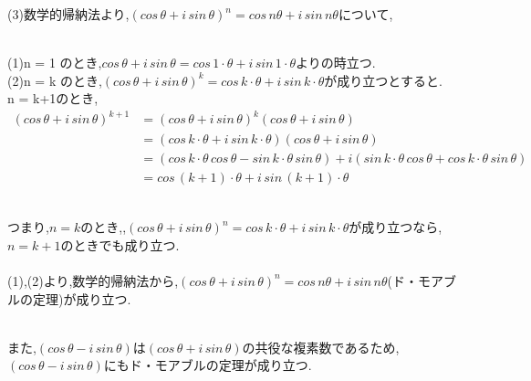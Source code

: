 \documentclass{jsarticle}
\begin{document}
\newpage
\raggedright (3)数学的帰納法より,$(cos\,\theta + i\,sin\,\theta)^n = cos\,n\theta + i\,sin\,n\theta$について,

\leavevmode\\
(1)\qquad n = 1 のとき,$cos\,\theta + i\,sin\,\theta = cos\,1\cdot \theta + i\,sin\,1\cdot \theta$よりの時立つ.\\
(2)\qquad n = k のとき,$(cos\,\theta + i\,sin\,\theta)^k = cos\,k \cdot \theta + i\,sin\,k \cdot \theta$が成り立つとすると.\\
\quad\qquad n = k+1のとき,
\begin{align*}
  (cos\,\theta + i\,sin\,\theta)^{k+1} &= (cos\,\theta + i\,sin\,\theta)^{k}(cos\,\theta + i\,sin\,\theta)\\
                                       &= (cos\,k \cdot \theta + i\,sin\,k \cdot \theta)(cos\,\theta + i\,sin\,\theta)\\
                                       &= (cos\,k \cdot \theta\, cos\, \theta - sin\,k \cdot \theta\, sin\, \theta) + i(sin\,k \cdot \theta\, cos\, \theta + cos\,k \cdot \theta\, sin\, \theta)\\
                                       &= cos\,(k+1) \cdot \theta + i\,sin\,(k+1) \cdot \theta
\end{align*} 

\leavevmode\\
つまり,$n = k$のとき,,$(cos\,\theta + i\,sin\,\theta)^n = cos\,k \cdot \theta + i\,sin\,k \cdot \theta$が成り立つなら,$n = k+1$のときでも成り立つ.\\

\leavevmode\\
(1),(2)より,数学的帰納法から,$(cos\,\theta + i\,sin\,\theta)^n = cos\,n\theta + i\,sin\,n\theta$(ド・モアブルの定理)が成り立つ.

\leavevmode\\
また,$(cos\,\theta - i\,sin\,\theta)$は$(cos\,\theta + i\,sin\,\theta)$の共役な複素数であるため,
$(cos\,\theta - i\,sin\,\theta)$にもド・モアブルの定理が成り立つ.
\end{document}
